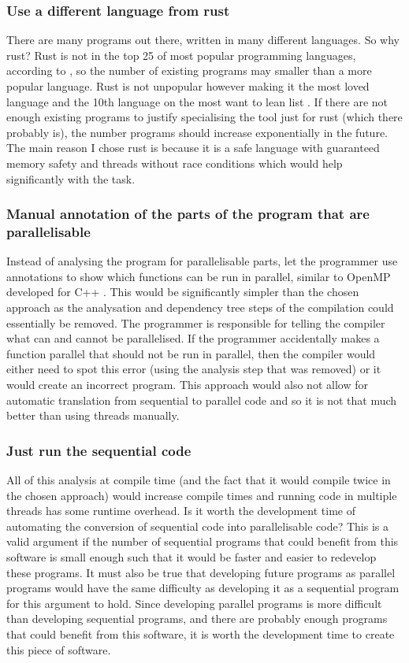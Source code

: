 \documentclass[12pt, a4paper]{article}
\begin{document}
\subsubsection{Use a different language from rust}
There are many programs out there, written in many different languages. So why rust? Rust is not in the top 25 of most popular programming languages, according to \textcite{stackoverflowsurvey}, so the number of existing programs may smaller than a more popular language. Rust is not unpopular however making it the most loved language and the 10th language on the most want to lean list \parencite{stackoverflowsurvey}. If there are not enough existing programs to justify specialising the tool just for rust (which there probably is), the number programs should increase exponentially in the future. The main reason I chose rust is because it is a safe language with guaranteed memory safety and threads without race conditions which would help significantly with the task.

\subsubsection{Manual annotation of the parts of the program that are parallelisable}
Instead of analysing the program for parallelisable parts, let the programmer use annotations to show which functions can be run in parallel, similar to OpenMP developed for C++ \parencite{dagum1998openmp}. This would be significantly simpler than the chosen approach as the analysation and dependency tree steps of the compilation could essentially be removed. The programmer is responsible for telling the compiler what can and cannot be parallelised. If the programmer accidentally makes a function parallel that should not be run in parallel, then the compiler would either need to spot this error (using the analysis step that was removed) or it would create an incorrect program. This approach would also not allow for automatic translation from sequential to parallel code and so it is not that much better than using threads manually.

\subsubsection{Just run the sequential code}
All of this analysis at compile time (and the fact that it would compile twice in the chosen approach) would increase compile times and running code in multiple threads has some runtime overhead. Is it worth the development time of automating the conversion of sequential code into parallelisable code? This is a valid argument if the number of sequential programs that could benefit from this software is small enough such that it would be faster and easier to redevelop these programs. It must also be true that developing future programs as parallel programs would have the same difficulty as developing it as a sequential program for this argument to hold. Since developing parallel programs is more difficult than developing sequential programs, and there are probably enough programs that could benefit from this software, it is worth the development time to create this piece of software. 
\end{document}
